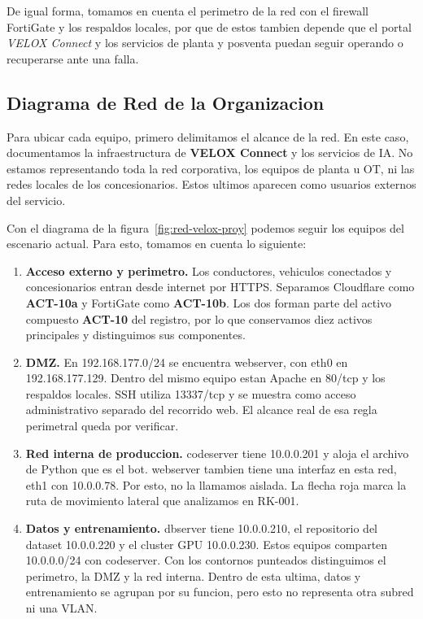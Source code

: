 \documentclass[letterpaper,11pt]{article}
\begin{document}
De igual forma, tomamos en cuenta el perimetro de la red con el
firewall FortiGate y los respaldos locales, por que de estos tambien
depende que el portal \textit{VELOX Connect} y los servicios de
planta y posventa puedan seguir operando o recuperarse ante una
falla.

\subsection{Diagrama de Red de la Organizacion}

Para ubicar cada equipo, primero delimitamos el alcance de la red.
En este caso, documentamos la infraestructura de \textbf{VELOX Connect}
y los servicios de IA. No estamos representando toda la red corporativa,
los equipos de planta u OT, ni las redes locales de los concesionarios.
Estos ultimos aparecen como usuarios externos del servicio.


Con el diagrama de la figura~\ref{fig:red-velox-proy} podemos seguir
los equipos del escenario actual. Para esto, tomamos en cuenta lo siguiente:
\begin{enumerate}[noitemsep,topsep=2pt]
    \item \textbf{Acceso externo y perimetro.} Los conductores,
    vehiculos conectados y concesionarios entran desde internet por
    HTTPS. Separamos Cloudflare como \textbf{ACT-10a} y FortiGate como
    \textbf{ACT-10b}. Los dos forman parte del activo compuesto
    \textbf{ACT-10} del registro, por lo que conservamos diez activos
    principales y distinguimos sus componentes.
    \item \textbf{DMZ.} En 192.168.177.0/24 se encuentra webserver,
    con eth0 en 192.168.177.129. Dentro del mismo equipo estan Apache
    en 80/tcp y los respaldos locales. SSH utiliza 13337/tcp y se
    muestra como acceso administrativo separado del recorrido web.
    El alcance real de esa regla perimetral queda por verificar.
    \item \textbf{Red interna de produccion.} codeserver tiene
    10.0.0.201 y aloja el archivo de Python que es el bot. webserver
    tambien tiene una interfaz en esta red, eth1 con 10.0.0.78.
    Por esto, no la llamamos aislada. La flecha roja marca la ruta
    de movimiento lateral que analizamos en RK-001.
    \item \textbf{Datos y entrenamiento.} dbserver tiene 10.0.0.210,
    el repositorio del dataset 10.0.0.220 y el cluster GPU 10.0.0.230.
    Estos equipos comparten 10.0.0.0/24 con codeserver. Con los
    contornos punteados distinguimos el perimetro, la DMZ y la red
    interna. Dentro de esta ultima, datos y entrenamiento se agrupan
    por su funcion, pero esto no representa otra subred ni una VLAN.
\end{enumerate}
\end{document}
